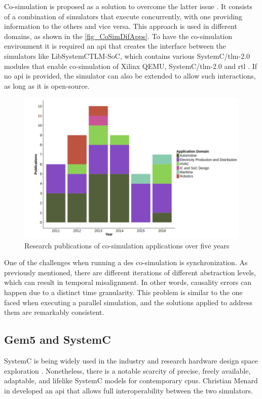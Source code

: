 Co-simulation is proposed as a solution to overcome the latter issue \cite{gomes2017co}. It consists of a combination of simulators that 
execute concurrently, with one providing information to the others and vice versa. This approach is used in different domains, as shown in 
the \autoref{fig_CoSimDifApps}. To have the co-simulation environment it is required an \gls{api} that creates the interface between the 
simulators like LibSystemCTLM-SoC, which contains various SystemC/\gls{tlm}-2.0 modules that enable co-simulation of Xilinx QEMU, 
SystemC/\gls{tlm}-2.0 and \gls{rtl} \cite{XilinxLibsystemctlm-SOC}. If no \gls{api} is provided, the simulator can also be extended to allow 
such interactions, as long
as it is open-source.

\begin{figure}[]
	\centering
 	\includegraphics[width=0.7\linewidth]{Images/CoSimDifApps.png}
 	\caption{Research publications of co-simulation applications over five years\cite{gomes2017co}}
	 \label{fig_CoSimDifApps}
\end{figure}

One of the challenges when running a \gls{des} co-simulation is synchronization. As previously mentioned, there are different 
iterations of different abstraction levels, which can result in temporal misalignment. In other words, causality errors can happen due to a 
distinct time granularity. This problem is similar to the one faced when executing a parallel simulation, and the solutions applied to address 
them are remarkably consistent. 


\subsection{Gem5 and SystemC}

SystemC is being widely used in the industry and research hardware design space exploration \cite{menard2017system}. Nonetheless, there 
is a notable scarcity of precise, freely available, adaptable, and lifelike SystemC models for contemporary \glspl{cpu}. Christian Menard 
in \cite{menard2017system} developed an \gls{api} that allows full interoperability between the two simulators. 

